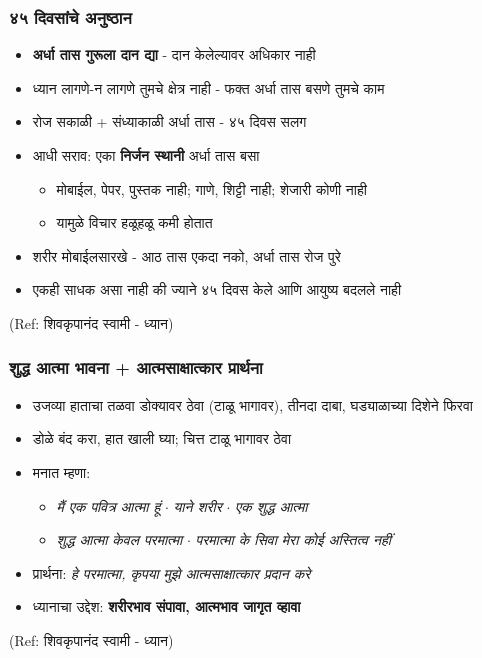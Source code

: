 \begin{frame}[fragile]\frametitle{४५ दिवसांचे अनुष्ठान}

	\begin{itemize}
	\item \textbf{अर्धा तास गुरूला दान द्या} - दान केलेल्यावर अधिकार नाही
	\item ध्यान लागणे-न लागणे तुमचे क्षेत्र नाही - फक्त अर्धा तास बसणे तुमचे काम
	\item रोज सकाळी + संध्याकाळी अर्धा तास - ४५ दिवस सलग
	\item आधी सराव: एका \textbf{निर्जन स्थानी} अर्धा तास बसा
		\begin{itemize}
		\item मोबाईल, पेपर, पुस्तक नाही; गाणे, शिट्टी नाही; शेजारी कोणी नाही
		\item यामुळे विचार हळूहळू कमी होतात
		\end{itemize}
	\item शरीर मोबाईलसारखे - आठ तास एकदा नको, अर्धा तास रोज पुरे
	\item एकही साधक असा नाही की ज्याने ४५ दिवस केले आणि आयुष्य बदलले नाही
	\end{itemize}

{\tiny (Ref: शिवकृपानंद स्वामी - ध्यान)}

\end{frame}

\begin{frame}[fragile]\frametitle{शुद्ध आत्मा भावना + आत्मसाक्षात्कार प्रार्थना}

	\begin{itemize}
	\item उजव्या हाताचा तळवा डोक्यावर ठेवा (टाळू भागावर), तीनदा दाबा, घड्याळाच्या दिशेने फिरवा
	\item डोळे बंद करा, हात खाली घ्या; चित्त टाळू भागावर ठेवा
	\item मनात म्हणा:
		\begin{itemize}
		\item \textit{मैं एक पवित्र आत्मा हूं} $\cdot$ \textit{याने शरीर} $\cdot$ \textit{एक शुद्ध आत्मा}
		\item \textit{शुद्ध आत्मा केवल परमात्मा} $\cdot$ \textit{परमात्मा के सिवा मेरा कोई अस्तित्व नहीं}
		\end{itemize}
	\item प्रार्थना: \textit{हे परमात्मा, कृपया मुझे आत्मसाक्षात्कार प्रदान करे}
	\item ध्यानाचा उद्देश: \textbf{शरीरभाव संपावा, आत्मभाव जागृत व्हावा}
	\end{itemize}

{\tiny (Ref: शिवकृपानंद स्वामी - ध्यान)}

\end{frame}

